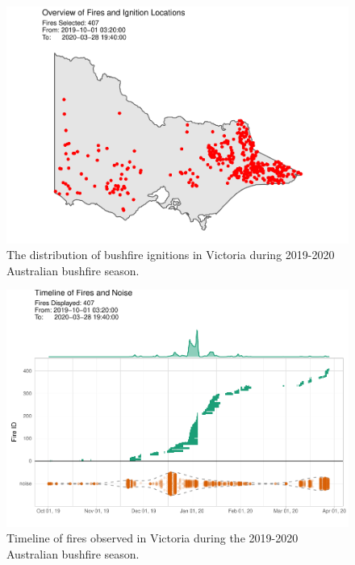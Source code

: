 \begin{Schunk}
\begin{figure}

{\centering \includegraphics[width=0.8\linewidth]{clustering_paper_files/figure-latex/clusteringfinalresults-1} 

}

\caption[ The distribution of bushfire ignitions in Victoria during 2019-2020 Australian bushfire season]{ The distribution of bushfire ignitions in Victoria during 2019-2020 Australian bushfire season.}\label{fig:clusteringfinalresults}
\end{figure}
\end{Schunk}

\begin{Schunk}
\begin{figure}

{\centering \includegraphics[width=0.8\linewidth]{clustering_paper_files/figure-latex/himtimeline-1} 

}

\caption[Timeline of fires observed in Victoria during the 2019-2020 Australian bushfire season]{Timeline of fires observed in Victoria during the 2019-2020 Australian bushfire season.}\label{fig:himtimeline}
\end{figure}
\end{Schunk}

